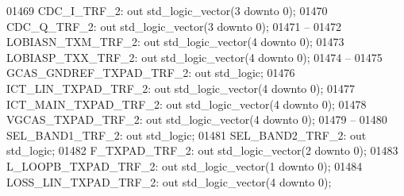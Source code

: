 \begin{DoxyCode}
01469         CDC\_I\_TRF\_2:    \textcolor{keywordflow}{out} \textcolor{comment}{std\_logic\_vector}(\textcolor{vhdllogic}{}\textcolor{vhdllogic}{3} \textcolor{keywordflow}{downto} \textcolor{vhdllogic}{}\textcolor{vhdllogic}{0});
01470         CDC\_Q\_TRF\_2:    \textcolor{keywordflow}{out} \textcolor{comment}{std\_logic\_vector}(\textcolor{vhdllogic}{}\textcolor{vhdllogic}{3} \textcolor{keywordflow}{downto} \textcolor{vhdllogic}{}\textcolor{vhdllogic}{0});
01471 \textcolor{keyword}{        --}
01472         LOBIASN\_TXM\_TRF\_2:  \textcolor{keywordflow}{out} \textcolor{comment}{std\_logic\_vector}(\textcolor{vhdllogic}{}\textcolor{vhdllogic}{4} \textcolor{keywordflow}{downto} \textcolor{vhdllogic}{}\textcolor{vhdllogic}{0});
01473         LOBIASP\_TXX\_TRF\_2:  \textcolor{keywordflow}{out} \textcolor{comment}{std\_logic\_vector}(\textcolor{vhdllogic}{}\textcolor{vhdllogic}{4} \textcolor{keywordflow}{downto} \textcolor{vhdllogic}{}\textcolor{vhdllogic}{0});
01474 \textcolor{keyword}{        --}
01475         GCAS\_GNDREF\_TXPAD\_TRF\_2:    \textcolor{keywordflow}{out} \textcolor{comment}{std\_logic};
01476         ICT\_LIN\_TXPAD\_TRF\_2:    \textcolor{keywordflow}{out} \textcolor{comment}{std\_logic\_vector}(\textcolor{vhdllogic}{}\textcolor{vhdllogic}{4} \textcolor{keywordflow}{downto} \textcolor{vhdllogic}{}\textcolor{vhdllogic}{0});
01477         ICT\_MAIN\_TXPAD\_TRF\_2:   \textcolor{keywordflow}{out} \textcolor{comment}{std\_logic\_vector}(\textcolor{vhdllogic}{}\textcolor{vhdllogic}{4} \textcolor{keywordflow}{downto} \textcolor{vhdllogic}{}\textcolor{vhdllogic}{0});
01478         VGCAS\_TXPAD\_TRF\_2:  \textcolor{keywordflow}{out} \textcolor{comment}{std\_logic\_vector}(\textcolor{vhdllogic}{}\textcolor{vhdllogic}{4} \textcolor{keywordflow}{downto} \textcolor{vhdllogic}{}\textcolor{vhdllogic}{0});
01479 \textcolor{keyword}{        --}
01480         SEL\_BAND1\_TRF\_2:    \textcolor{keywordflow}{out} \textcolor{comment}{std\_logic};
01481         SEL\_BAND2\_TRF\_2:    \textcolor{keywordflow}{out} \textcolor{comment}{std\_logic};
01482         F\_TXPAD\_TRF\_2:  \textcolor{keywordflow}{out} \textcolor{comment}{std\_logic\_vector}(\textcolor{vhdllogic}{}\textcolor{vhdllogic}{2} \textcolor{keywordflow}{downto} \textcolor{vhdllogic}{}\textcolor{vhdllogic}{0});
01483         L\_LOOPB\_TXPAD\_TRF\_2:    \textcolor{keywordflow}{out} \textcolor{comment}{std\_logic\_vector}(\textcolor{vhdllogic}{}\textcolor{vhdllogic}{1} \textcolor{keywordflow}{downto} \textcolor{vhdllogic}{}\textcolor{vhdllogic}{0});
01484         LOSS\_LIN\_TXPAD\_TRF\_2:   \textcolor{keywordflow}{out} \textcolor{comment}{std\_logic\_vector}(\textcolor{vhdllogic}{}\textcolor{vhdllogic}{4} \textcolor{keywordflow}{downto} \textcolor{vhdllogic}{}\textcolor{vhdllogic}{0});

\end{DoxyCode}
